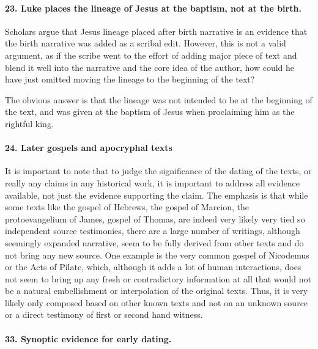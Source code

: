 \paragraph{23.
Luke places the lineage of Jesus at the baptism, not at the birth.}\label{par:luke-places-the-lineage-of-jesus-at-the-baptism-not-at-the-birth.}

Scholars argue that Jesus lineage placed after birth narrative is an evidence that the birth narrative was added as a scribal edit.
However, this is not a valid argument, as if the scribe went to the effort of adding major piece of text and blend it well into the narrative and the core idea of the author, how could he have just omitted moving the lineage to the beginning of the text?

The obvious answer is that the lineage was not intended to be at the beginning of the text, and was given at the baptism of Jesus when proclaiming him as the rightful king.

\paragraph{24.
Later gospels and apocryphal texts}\label{par:later-gospels-and-apocryphal-texts}

It is important to note that to judge the significance of the dating of the texts, or really any claims in any historical work, it is important to address all evidence available, not just the evidence supporting the claim.
The emphasis is that while some texts like the gospel of Hebrews, the gospel of Marcion, the protoevangelium of James, gospel of Thomas, are indeed very likely very tied so independent source testimonies, there are a large number of writings, although seemingly expanded narrative, seem to be fully derived from other texts and do not bring any new source.
One example is the very common gospel of Nicodemus or the Acts of Pilate, which, although it adds a lot of human interactions, does not seem to bring up any fresh or contradictory information at all that would not be a natural embellishment or interpolation of the original texts.
Thus, it is very likely only composed based on other known texts and not on an unknown source or a direct testimony of first or second hand witness.

\paragraph{33.
Synoptic evidence for early dating.}\label{par:synoptic-evidence-for-early-dating.}


